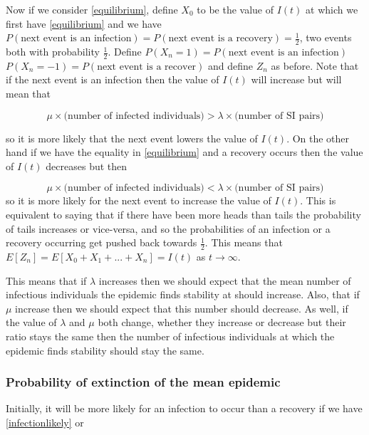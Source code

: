 \documentclass{uonmathsreport}
\begin{document}
Now if we consider \eqref{equilibrium}, define $X_0$ to be the value of $I(t)$ at which we first have \eqref{equilibrium} and we have $P(\mbox{next event is an infection})=P(\mbox{next event is a recovery})=\frac{1}{2}$, two events both with probability $\frac{1}{2}$. Define $P(X_n=1)=P(\mbox{next event is an infection})$ $P(X_n=-1)=P(\mbox{next event is a recover})$ and define $Z_n$ as before. Note that if the next event is an infection then the value of $I(t)$ will increase but will mean that 

\begin{equation}
\mu\times\mbox{(number of infected individuals)}>\lambda\times\mbox{(number of SI pairs)}
\end{equation}

\noindent
so it is more likely that the next event lowers the value of $I(t)$. On the other hand if we have the equality in \eqref{equilibrium} and a recovery occurs then the value of $I(t)$ decreases but then 

\begin{equation}\label{infectionlikely}
\mu\times\mbox{(number of infected individuals)}<\lambda\times\mbox{(number of SI pairs)}
\end{equation}
\noindent
so it is more likely for the next event to increase the value of $I(t)$. This is equivalent to saying that if there have been more heads than tails the probability of tails increases or vice-versa, and so the probabilities of an infection or a recovery occurring get pushed back towards $\frac{1}{2}$. This means that $E[Z_n]=E[X_0+X_1+...+X_n]=I(t)$ as $t \rightarrow \infty$.

This means that if $\lambda$ increases then we should expect that the mean number of infectious individuals the epidemic finds stability at should increase. Also, that if $\mu$ increase then we should expect that this number should decrease. As well, if the value of $\lambda$ and $\mu$ both change, whether they increase or decrease but their ratio stays the same then the number of infectious individuals at which the epidemic finds stability should stay the same.

\subsubsection{Probability of extinction of the mean epidemic} \label{subsub:5.4.3}

Initially, it will be more likely for an infection to occur than a recovery if we have \eqref{infectionlikely} or
\end{document}
